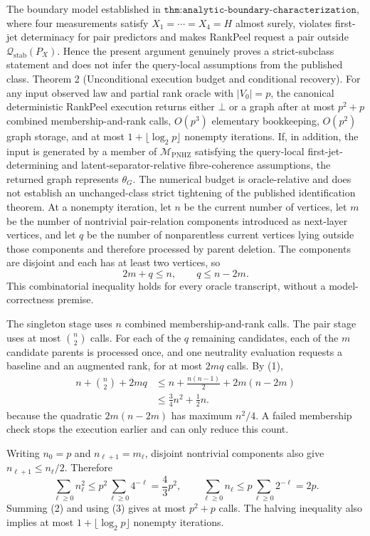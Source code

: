 The boundary model established in \(\texttt{thm:analytic-boundary-characterization}\), where four measurements satisfy \(X_1=\cdots=X_4=H\) almost surely, violates first-jet determinacy for pair predictors and makes RankPeel request a pair outside \(\mathcal Q_{\mathrm{stab}}(P_X)\).  Hence the present argument genuinely proves a strict-subclass statement and does not infer the query-local assumptions from the published class.
Theorem 2 (Unconditional execution budget and conditional recovery).  For any input observed law and partial rank oracle with \(|V_0|=p\), the canonical deterministic RankPeel execution returns either \(\bot\) or a graph after at most \(p^2+p\) combined membership-and-rank calls, \(O(p^3)\) elementary bookkeeping, \(O(p^2)\) graph storage, and at most \(1+\lfloor\log_2 p\rfloor\) nonempty iterations.  If, in addition, the input is generated by a member of \(\mathcal M_{\mathrm{PNHZ}}\) satisfying the query-local first-jet-determining and latent-separator-relative fibre-coherence assumptions, the returned graph represents \(\theta_G\).  The numerical budget is oracle-relative and does not establish an unchanged-class strict tightening of the published identification theorem.
At a nonempty iteration, let \(n\) be the current number of vertices, let \(m\) be the number of nontrivial pair-relation components introduced as next-layer vertices, and let \(q\) be the number of nonparentless current vertices lying outside those components and therefore processed by parent deletion.  The components are disjoint and each has at least two vertices, so
\[
 2m+q\leq n,
 \qquad q\leq n-2m. \tag{1}
\]
This combinatorial inequality holds for every oracle transcript, without a model-correctness premise.

The singleton stage uses \(n\) combined membership-and-rank calls.  The pair stage uses at most \(\binom n2\) calls.  For each of the \(q\) remaining candidates, each of the \(m\) candidate parents is processed once, and one neutrality evaluation requests a baseline and an augmented rank, for at most \(2mq\) calls.  By (1),
\[
 \begin{aligned}
 n+\binom n2+2mq
 &\leq n+\frac{n(n-1)}2+2m(n-2m)\\
 &\leq \frac34n^2+\frac12n.
 \end{aligned} \tag{2}
\]
because the quadratic \(2m(n-2m)\) has maximum \(n^2/4\).  A failed membership check stops the execution earlier and can only reduce this count.

Writing \(n_0=p\) and \(n_{\ell+1}=m_\ell\), disjoint nontrivial components also give \(n_{\ell+1}\leq n_\ell/2\).  Therefore
\[
 \sum_{\ell\geq0}n_\ell^2\leq p^2\sum_{\ell\geq0}4^{-\ell}=\frac43p^2,
 \qquad
 \sum_{\ell\geq0}n_\ell\leq p\sum_{\ell\geq0}2^{-\ell}=2p. \tag{3}
\]
Summing (2) and using (3) gives at most \(p^2+p\) calls.  The halving inequality also implies at most \(1+\lfloor\log_2p\rfloor\) nonempty iterations.

